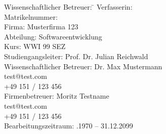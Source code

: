 \begin{titlepage}
\begin{center}
\begin{minipage}{\textwidth}
\begin{tabbing}
	Wissenschaftlicher Betreuer: \hspace{0.85cm}\=\kill
	Verfasserin: \> \DerAutorDerArbeit \\[1.5mm]
	Matrikelnummer:  \\[1.5mm]
	Firma: \> Musterfirma 123 \\[1.5mm]
	Abteilung: \> Softwareentwicklung \\[1.5mm]
	Kurs: \> WWI 99 SEZ \\[1.5mm]
	Studiengangsleiter: \> Prof. Dr. Julian Reichwald  \\[1.5mm]
	Wissenschaftlicher Betreuer: \> Dr. Max Mustermann \\
	\> test@test.com \\
	\> +49 151 / 123 456 \\[1.5mm]
	Firmenbetreuer: \> Moritz Testname \\
	\> test@test.com \\
	\> +49 151 / 123 456 \\[1.5mm]
	Bearbeitungszeitraum: .1970 -- 31.12.2099
\end{tabbing}
\end{minipage}

\end{center}

\end{titlepage}